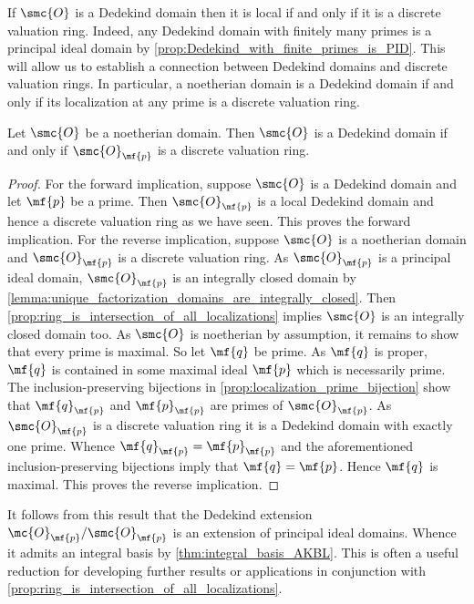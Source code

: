     If \(\smc{O}\) is a Dedekind domain then it is local if and only if it is a discrete valuation ring. Indeed, any Dedekind domain with finitely many primes is a principal ideal domain by \cref{prop:Dedekind_with_finite_primes_is_PID}. This will allow us to establish a connection between Dedekind domains and discrete valuation rings. In particular, a noetherian domain is a Dedekind domain if and only if its localization at any prime is a discrete valuation ring.

    \begin{theorem}\label{thm:Dedekind_if_and_only_if_all_localizations_are_discrete_valuation_rings}
      Let \(\smc{O}\) be a noetherian domain. Then \(\smc{O}\) is a Dedekind domain if and only if \(\smc{O}_{\mf{p}}\) is a discrete valuation ring.
    \end{theorem}
    \begin{proof}
      For the forward implication, suppose \(\smc{O}\) is a Dedekind domain and let \(\mf{p}\) be a prime. Then \(\smc{O}_{\mf{p}}\) is a local Dedekind domain and hence a discrete valuation ring as we have seen. This proves the forward implication. For the reverse implication, suppose \(\smc{O}\) is a noetherian domain and \(\smc{O}_{\mf{p}}\) is a discrete valuation ring. As \(\smc{O}_{\mf{p}}\) is a principal ideal domain, \(\smc{O}_{\mf{p}}\) is an integrally closed domain by \cref{lemma:unique_factorization_domains_are_integrally_closed}. Then \cref{prop:ring_is_intersection_of_all_localizations} implies \(\smc{O}\) is an integrally closed domain too. As \(\smc{O}\) is noetherian by assumption, it remains to show that every prime is maximal. So let \(\mf{q}\) be prime. As \(\mf{q}\) is proper, \(\mf{q}\) is contained in some maximal ideal \(\mf{p}\) which is necessarily prime. The inclusion-preserving bijections in \cref{prop:localization_prime_bijection} show that \(\mf{q}_{\mf{p}}\) and \(\mf{p}_{\mf{p}}\) are primes of \(\smc{O}_{\mf{p}}\). As \(\smc{O}_{\mf{p}}\) is a discrete valuation ring it is a Dedekind domain with exactly one prime. Whence \(\mf{q}_{\mf{p}} = \mf{p}_{\mf{p}}\) and the aforementioned inclusion-preserving bijections imply that \(\mf{q} = \mf{p}\). Hence \(\mf{q}\) is maximal. This proves the reverse implication.
    \end{proof}

    It follows from this result that the Dedekind extension \(\mc{O}_{\mf{p}}/\smc{O}_{\mf{p}}\) is an extension of principal ideal domains. Whence it admits an integral basis by \cref{thm:integral_basis_AKBL}. This is often a useful reduction for developing further results or applications in conjunction with \cref{prop:ring_is_intersection_of_all_localizations}.

